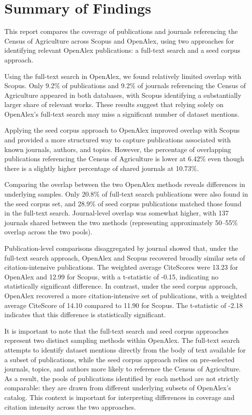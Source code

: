 \documentclass[
  letterpaper,
  DIV=11,
  numbers=noendperiod]{scrartcl}
\begin{document}
\section{\texorpdfstring{\Large Summary of
Findings}{Summary of Findings}}\label{summary-of-findings}

This report compares the coverage of publications and journals
referencing the Census of Agriculture across Scopus and OpenAlex, using
two approaches for identifying relevant OpenAlex publications: a
full-text search and a seed corpus approach.

Using the full-text search in OpenAlex, we found relatively limited
overlap with Scopus. Only 9.2\% of publications and 9.2\% of journals
referencing the Census of Agriculture appeared in both databases, with
Scopus identifying a substantially larger share of relevant works. These
results suggest that relying solely on OpenAlex's full-text search may
miss a significant number of dataset mentions.

Applying the seed corpus approach to OpenAlex improved overlap with
Scopus and provided a more structured way to capture publications
associated with known journals, authors, and topics. However, the
percentage of overlapping publications referencing the Census of
Agriculture is lower at 6.42\% even though there is a slightly higher
percentage of shared journals at 10.73\%.

Comparing the overlap between the two OpenAlex methods reveals
differences in underlying samples. Only 20.8\% of full-text search
publications were also found in the seed corpus set, and 28.9\% of seed
corpus publications matched those found in the full-text search.
Journal-level overlap was somewhat higher, with 137 journals shared
between the two methods (representing approximately 50--55\% overlap
across the two pools).

Publication-level comparisons disaggregated by journal showed that,
under the full-text search approach, OpenAlex and Scopus recovered
broadly similar sets of citation-intensive publications. The weighted
average CiteScores were 13.23 for OpenAlex and 12.99 for Scopus, with a
t-statistic of -0.15, indicating no statistically significant
difference. In contrast, under the seed corpus approach, OpenAlex
recovered a more citation-intensive set of publications, with a weighted
average CiteScore of 14.10 compared to 11.90 for Scopus. The t-statistic
of -2.18 indicates that this difference is statistically significant.

It is important to note that the full-text search and seed corpus
approaches represent two distinct sampling methods within OpenAlex. The
full-text search attempts to identify dataset mentions directly from the
body of text available for a subset of publications, while the seed
corpus approach relies on pre-selected journals, topics, and authors
more likely to reference the Census of Agriculture. As a result, the
pools of publications identified by each method are not strictly
comparable: they are drawn from different underlying subsets of
OpenAlex's catalog. This context is important for interpreting
differences in coverage and citation intensity across the two
approaches.
\end{document}
